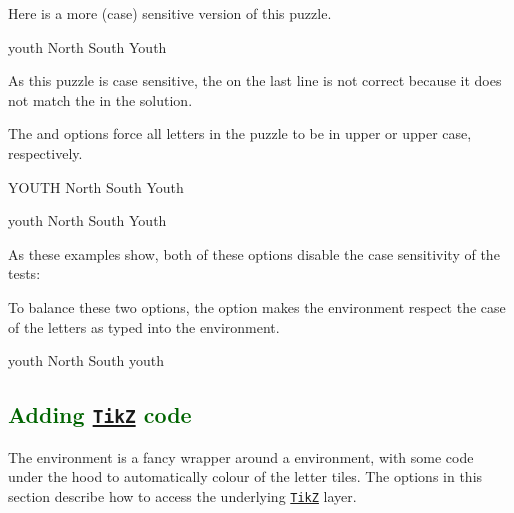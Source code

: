 \documentclass[svgnames]{report}
\newcommand\ctan[1]{\href{https://www.ctan.org/pkg/#1}{\texttt{#1}}}
\newcommand\Section[1]{\subsection{\textcolor{DarkGreen}{#1}}}
\begin{document}
  Here is a more (case) sensitive version of this puzzle.

  \begin{example}
    \begin{wordle}[case sensitive=true]{youth}
      North
      South
      Youth
    \end{wordle}
  \end{example}

  As this puzzle is case sensitive, the  on the last line
  is not correct because it does not match the  in the
  solution.

  The  and  options force all
  letters in the puzzle to be in upper or upper case, respectively.

  \begin{example}
    \begin{wordle}{YOUTH}
      North
      South
      Youth
    \end{wordle}
  \end{example}

  \begin{example}
    \begin{wordle}{youth}
      North
      South
      Youth
    \end{wordle}
  \end{example}

  As these examples show, both of these options disable the case sensitivity of the tests:

  To balance these two options, the  option makes
  the  environment respect the case of the letters as
  typed into the environment.

  \begin{example}
    \begin{wordle}{youth}
      North
      South
      youth
    \end{wordle}
  \end{example}

  \Section{Adding \ctan{TikZ} code}

  The  environment is a fancy wrapper around a
   environment, with some code under the hood
  to automatically colour of the letter tiles. The options in this
  section describe how to access the underlying \ctan{TikZ} layer.

\end{document}
